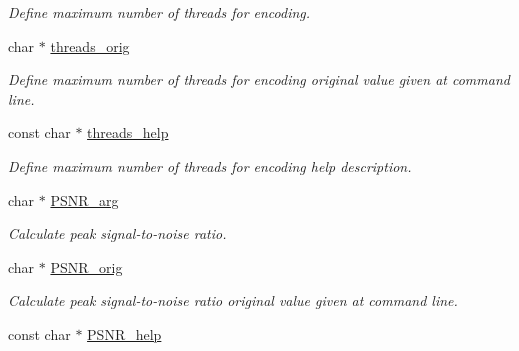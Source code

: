 \begin{DoxyCompactItemize}
\begin{DoxyCompactList}\small\item\em Define maximum number of threads for encoding. \end{DoxyCompactList}\item 
\hypertarget{structgengetopt__args__info_ac320dd1a21d70ec2ecdf49c04d419398}{}char $\ast$ \hyperlink{structgengetopt__args__info_ac320dd1a21d70ec2ecdf49c04d419398}{threads\+\_\+orig}\label{structgengetopt__args__info_ac320dd1a21d70ec2ecdf49c04d419398}

\begin{DoxyCompactList}\small\item\em Define maximum number of threads for encoding original value given at command line. \end{DoxyCompactList}\item 
\hypertarget{structgengetopt__args__info_a9f5692f878b8259e30107df82981cc58}{}const char $\ast$ \hyperlink{structgengetopt__args__info_a9f5692f878b8259e30107df82981cc58}{threads\+\_\+help}\label{structgengetopt__args__info_a9f5692f878b8259e30107df82981cc58}

\begin{DoxyCompactList}\small\item\em Define maximum number of threads for encoding help description. \end{DoxyCompactList}\item 
\hypertarget{structgengetopt__args__info_a7291cfcef05f542308c7c3143d889c14}{}char $\ast$ \hyperlink{structgengetopt__args__info_a7291cfcef05f542308c7c3143d889c14}{P\+S\+N\+R\+\_\+arg}\label{structgengetopt__args__info_a7291cfcef05f542308c7c3143d889c14}

\begin{DoxyCompactList}\small\item\em Calculate peak signal-\/to-\/noise ratio. \end{DoxyCompactList}\item 
\hypertarget{structgengetopt__args__info_a3cc73f5df3a1aeb39ee2e4ab3c55c34c}{}char $\ast$ \hyperlink{structgengetopt__args__info_a3cc73f5df3a1aeb39ee2e4ab3c55c34c}{P\+S\+N\+R\+\_\+orig}\label{structgengetopt__args__info_a3cc73f5df3a1aeb39ee2e4ab3c55c34c}

\begin{DoxyCompactList}\small\item\em Calculate peak signal-\/to-\/noise ratio original value given at command line. \end{DoxyCompactList}\item 
\hypertarget{structgengetopt__args__info_a6e0aef96a1e31eee0d105bf43e56544a}{}const char $\ast$ \hyperlink{structgengetopt__args__info_a6e0aef96a1e31eee0d105bf43e56544a}{P\+S\+N\+R\+\_\+help}\label{structgengetopt__args__info_a6e0aef96a1e31eee0d105bf43e56544a}


\end{DoxyCompactItemize}
